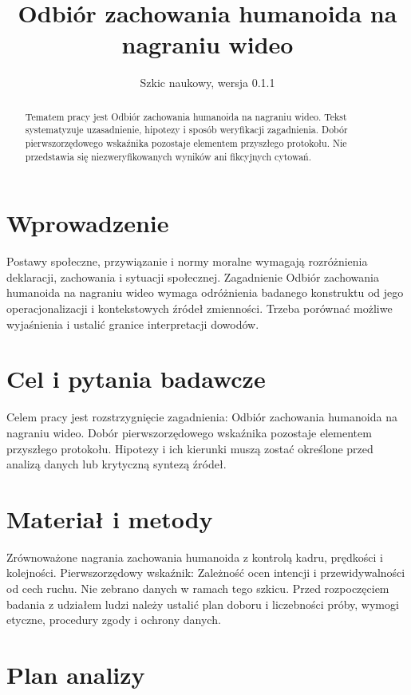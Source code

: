 \documentclass[11pt,a4paper]{article}
\title{Odbiór zachowania humanoida na nagraniu wideo}
\author{}
\date{Szkic naukowy, wersja 0.1.1}
\begin{document}
\maketitle

\begin{abstract}

Tematem pracy jest Odbiór zachowania humanoida na nagraniu wideo. Tekst systematyzuje uzasadnienie, hipotezy i sposób weryfikacji zagadnienia. Dobór pierwszorzędowego wskaźnika pozostaje elementem przyszłego protokołu. Nie przedstawia się niezweryfikowanych wyników ani fikcyjnych cytowań.

\end{abstract}

\section{Wprowadzenie}

Postawy społeczne, przywiązanie i normy moralne wymagają rozróżnienia deklaracji, zachowania i sytuacji społecznej. Zagadnienie Odbiór zachowania humanoida na nagraniu wideo wymaga odróżnienia badanego konstruktu od jego operacjonalizacji i kontekstowych źródeł zmienności. Trzeba porównać możliwe wyjaśnienia i ustalić granice interpretacji dowodów.

\section{Cel i pytania badawcze}

Celem pracy jest rozstrzygnięcie zagadnienia: Odbiór zachowania humanoida na nagraniu wideo. Dobór pierwszorzędowego wskaźnika pozostaje elementem przyszłego protokołu. Hipotezy i ich kierunki muszą zostać określone przed analizą danych lub krytyczną syntezą źródeł.

\section{Materiał i metody}

Zrównoważone nagrania zachowania humanoida z kontrolą kadru, prędkości i kolejności. Pierwszorzędowy wskaźnik: Zależność ocen intencji i przewidywalności od cech ruchu. Nie zebrano danych w ramach tego szkicu. Przed rozpoczęciem badania z udziałem ludzi należy ustalić plan doboru i liczebności próby, wymogi etyczne, procedury zgody i ochrony danych.

\section{Plan analizy}
\end{document}
